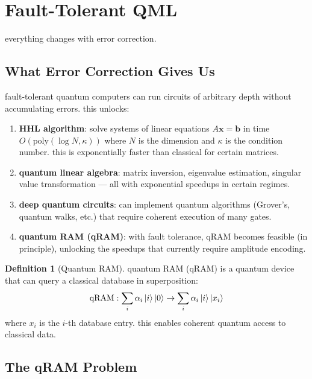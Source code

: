 \documentclass[11pt,a4paper]{article}
\theoremstyle{definition}
\newtheorem{definition}{Definition}[section]
\theoremstyle{remark}
\begin{document}
\section{Fault-Tolerant QML}

everything changes with error correction.

\subsection{What Error Correction Gives Us}

fault-tolerant quantum computers can run circuits of arbitrary depth without accumulating errors. this unlocks:

\begin{enumerate}[label=\arabic*.]
    \item \textbf{HHL algorithm}: solve systems of linear equations $A\mathbf{x} = \mathbf{b}$ in time $O(\text{poly}(\log N, \kappa))$ where $N$ is the dimension and $\kappa$ is the condition number. this is exponentially faster than classical for certain matrices.

    \item \textbf{quantum linear algebra}: matrix inversion, eigenvalue estimation, singular value transformation --- all with exponential speedups in certain regimes.

    \item \textbf{deep quantum circuits}: can implement quantum algorithms (Grover's, quantum walks, etc.) that require coherent execution of many gates.

    \item \textbf{quantum RAM (qRAM)}: with fault tolerance, qRAM becomes feasible (in principle), unlocking the speedups that currently require amplitude encoding.
\end{enumerate}

\begin{definition}[Quantum RAM]
quantum RAM (qRAM) is a quantum device that can query a classical database in superposition:
\[
\text{qRAM}: \sum_i \alpha_i \ket{i}\ket{0} \to \sum_i \alpha_i \ket{i}\ket{x_i}
\]
where $x_i$ is the $i$-th database entry. this enables coherent quantum access to classical data.
\end{definition}

\subsection{The qRAM Problem}
\end{document}
